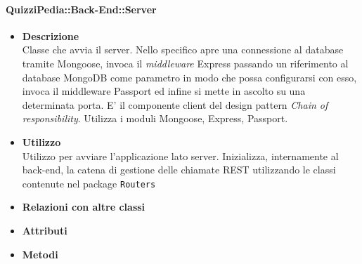 	\paragraph{QuizziPedia::Back-End::Server}
	\begin{itemize}
		\item \textbf{Descrizione} \\
		Classe che avvia il server. Nello specifico apre una connessione al database tramite Mongoose, invoca il \textit{middleware} Express passando un riferimento al database MongoDB come parametro in modo  che possa configurarsi con esso, invoca il middleware Passport ed infine si mette in ascolto su una determinata porta. E' il componente client del design pattern \textit{Chain of responsibility}. Utilizza i moduli Mongoose, Express, Passport.
		\item \textbf{Utilizzo} \\
		Utilizzo per avviare l'applicazione lato server. Inizializza, internamente al back-end, la catena di gestione delle chiamate REST utilizzando le classi contenute nel package \texttt{Routers}
		\item \textbf{Relazioni con altre classi}
		\item \textbf{Attributi}
		\item \textbf{Metodi}
	\end{itemize}
	